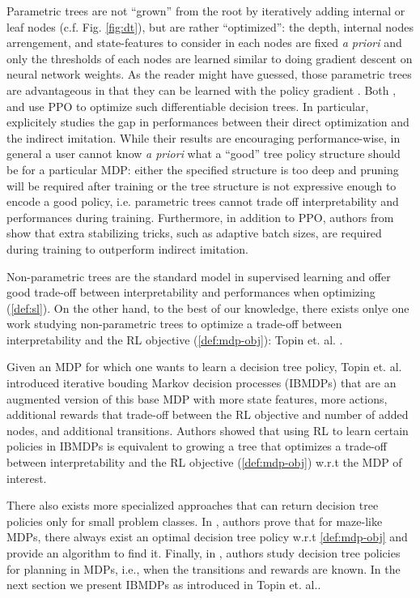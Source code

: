 Parametric trees are not ``grown'' from the root by iteratively adding internal or leaf nodes (c.f. Fig. \ref{fig:dt}), but are rather ``optimized'': the depth, internal nodes arrengement, and state-features to consider in each nodes are fixed \textit{a priori} and only the thresholds of each nodes are learned similar to doing gradient descent on neural network weights.
As the reader might have guessed, those parametric trees are advantageous in that they can be learned with the policy gradient \cite{pg_sutton}. Both \cite{silva}, \cite{vos2024optimizinginterpretabledecisiontree} and \cite{sympol} use PPO \cite{ppo} to optimize such differentiable decision trees. In particular, \cite{sympol} explicitely studies the gap in performances between their direct optimization and the indirect imitation.
While their results are encouraging performance-wise, in general a user cannot know \textit{a priori}  what a ``good'' tree policy structure should be for a particular MDP: either the specified structure is too deep and pruning will be required after training or the tree structure is not expressive enough to encode a good policy, i.e. parametric trees cannot trade off interpretability and performances during training.
Furthermore, in addition to PPO, authors from \cite{sympol} show that extra stabilizing tricks, such as adaptive batch sizes, are required during training to outperform indirect imitation.

Non-parametric trees are the standard model in supervised learning \cite{breiman1984classification,ID3,c45} and offer good trade-off between interpretability and performances when optimizing (\ref{def:sl}).
On the other hand, to the best of our knowledge, there exists onlye one work studying non-parametric trees to optimize a trade-off between interpretability and the RL objective (\ref{def:mdp-obj}): Topin et. al. \cite{topin2021iterative}.

Given an MDP for which one wants to learn a decision tree policy, Topin et. al. introduced iterative bouding Markov decision processes (IBMDPs) that are an augmented version of this base MDP with more state features, more actions, additional rewards that trade-off between the RL objective and number of added nodes, and additional transitions.
Authors showed that using RL to learn certain policies in IBMDPs is equivalent to growing a tree that optimizes a trade-off between interpretability and the RL objective (\ref{def:mdp-obj}) w.r.t the MDP of interest.

There also exists more specialized approaches that can return decision tree policies only for small problem classes.
In \cite{dt-maze}, authors prove that for maze-like MDPs, there always exist an optimal decision tree policy w.r.t \ref{def:mdp-obj} and provide an algorithm to find it. 
Finally, in \cite{dt-opt-mdp}, authors study decision tree policies for planning in MDPs, i.e., when the transitions and rewards are known.
In the next section we present IBMDPs as introduced in Topin et. al.\cite{topin2021iterative}.

